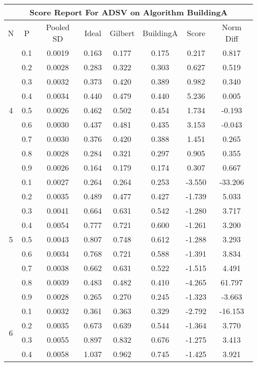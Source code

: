 \documentclass[11pt,a4paper]{report}
\begin{document}
\begin{longtable}{ | c | c || c | c | c | c | c | c | }
\hline
\multicolumn{8}{|c|}{ Score Report For ADSV on Algorithm BuildingA} \\
\hline
N & P & Pooled SD &  Ideal &  Gilbert & BuildingA  & Score & Norm Diff \\
 \hline
 \hline
 \endhead
\multirow{9}{*}{4} & 0.1 & 0.0019 & 0.163 & 0.177 & 0.175 & 0.217 & 0.817 \\
 & 0.2 & 0.0028 & 0.283 & 0.322 & 0.303 & 0.627 & 0.519 \\
 & 0.3 & 0.0032 & 0.373 & 0.420 & 0.389 & 0.982 & 0.340 \\
 & 0.4 & 0.0034 & 0.440 & 0.479 & 0.440 & 5.236 & 0.005 \\
 & 0.5 & 0.0026 & 0.462 & 0.502 & 0.454 & 1.734 & -0.193 \\
 & 0.6 & 0.0030 & 0.437 & 0.481 & 0.435 & 3.153 & -0.043 \\
 & 0.7 & 0.0030 & 0.376 & 0.420 & 0.388 & 1.451 & 0.265 \\
 & 0.8 & 0.0028 & 0.284 & 0.321 & 0.297 & 0.905 & 0.355 \\
 & 0.9 & 0.0026 & 0.164 & 0.179 & 0.174 & 0.307 & 0.667 \\
 \hline
\multirow{9}{*}{5} & 0.1 & 0.0027 & 0.264 & 0.264 & 0.253 & -3.550 & -33.206 \\
 & 0.2 & 0.0035 & 0.489 & 0.477 & 0.427 & -1.739 & 5.033 \\
 & 0.3 & 0.0041 & 0.664 & 0.631 & 0.542 & -1.280 & 3.717 \\
 & 0.4 & 0.0054 & 0.777 & 0.721 & 0.600 & -1.261 & 3.200 \\
 & 0.5 & 0.0043 & 0.807 & 0.748 & 0.612 & -1.288 & 3.293 \\
 & 0.6 & 0.0034 & 0.768 & 0.721 & 0.588 & -1.391 & 3.834 \\
 & 0.7 & 0.0038 & 0.662 & 0.631 & 0.522 & -1.515 & 4.491 \\
 & 0.8 & 0.0039 & 0.483 & 0.482 & 0.410 & -4.265 & 61.797 \\
 & 0.9 & 0.0028 & 0.265 & 0.270 & 0.245 & -1.323 & -3.663 \\
 \hline
\multirow{9}{*}{6} & 0.1 & 0.0032 & 0.361 & 0.363 & 0.329 & -2.792 & -16.153 \\
 & 0.2 & 0.0035 & 0.673 & 0.639 & 0.544 & -1.364 & 3.770 \\
 & 0.3 & 0.0055 & 0.897 & 0.832 & 0.676 & -1.275 & 3.413 \\
 & 0.4 & 0.0058 & 1.037 & 0.962 & 0.745 & -1.425 & 3.921 \\

\end{longtable}
\end{document}

